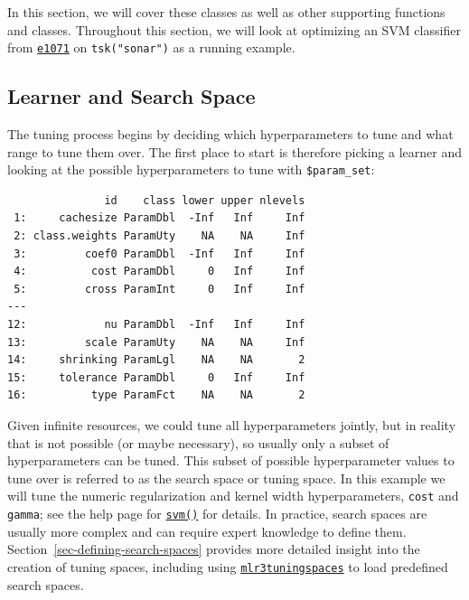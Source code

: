 In this section, we will cover these classes as well as other supporting
functions and classes. Throughout this section, we will look at
optimizing an SVM classifier from
\href{https://cran.r-project.org/package=e1071}{\texttt{e1071}} on
\texttt{tsk("sonar")} as a running example.

\hypertarget{sec-learner-search-space}{%
\subsection{Learner and Search Space}\label{sec-learner-search-space}}

The tuning process begins by deciding which hyperparameters to tune and
what range to tune them over. The first place to start is therefore
picking a learner and looking at the possible hyperparameters to tune
with \texttt{\$param\_set}:

\begin{Shaded}
\begin{Highlighting}[]
\NormalTok{(}\NormalTok{(}\NormalTok{)}\SpecialCharTok{$}\NormalTok{param\_set)[,}
\NormalTok{  .(id, class, lower, upper, nlevels)]}
\end{Highlighting}
\end{Shaded}

\begin{verbatim}
               id    class lower upper nlevels
 1:     cachesize ParamDbl  -Inf   Inf     Inf
 2: class.weights ParamUty    NA    NA     Inf
 3:         coef0 ParamDbl  -Inf   Inf     Inf
 4:          cost ParamDbl     0   Inf     Inf
 5:         cross ParamInt     0   Inf     Inf
---                                           
12:            nu ParamDbl  -Inf   Inf     Inf
13:         scale ParamUty    NA    NA     Inf
14:     shrinking ParamLgl    NA    NA       2
15:     tolerance ParamDbl     0   Inf     Inf
16:          type ParamFct    NA    NA       2
\end{verbatim}

Given infinite resources, we could tune all hyperparameters jointly, but
in reality that is not possible (or maybe necessary), so usually only a
subset of hyperparameters can be tuned. This subset of possible
hyperparameter values to tune over is referred to as the search
space or tuning
space. In this example we will
tune the numeric regularization and kernel width hyperparameters,
\texttt{cost} and \texttt{gamma}; see the help page for
\href{https://www.rdocumentation.org/packages/e1071/topics/svm}{\texttt{svm()}}
for details. In practice, search spaces are usually more complex and can
require expert knowledge to define them.
Section~\ref{sec-defining-search-spaces} provides more detailed insight
into the creation of tuning spaces, including using
\href{https://mlr3tuningspaces.mlr-org.com}{\texttt{mlr3tuningspaces}}
to load predefined search spaces.

